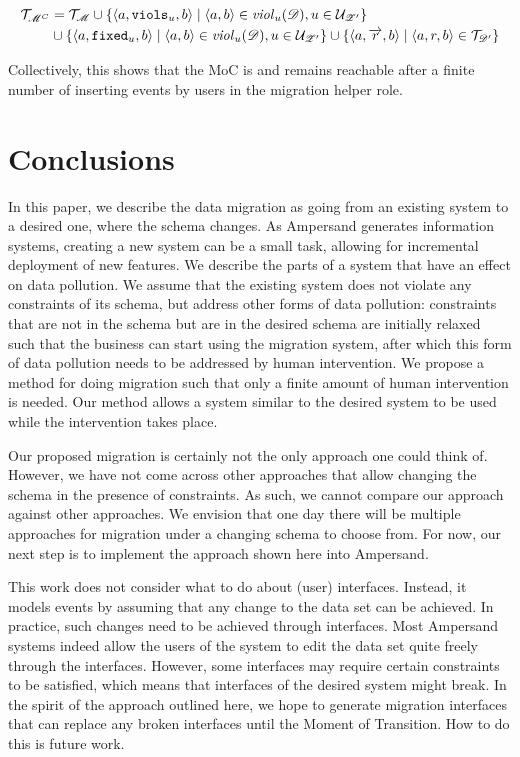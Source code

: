 \documentclass[runningheads]{llncs}
\newcommand{\id}[1]{\text{\it #1\/}}
\newcommand{\viol}[2]{\violC{#1}(#2)}
\newcommand{\violC}[1]{\id{viol}_{#1}}
\newcommand{\pair}[2]{\langle{#1},{#2}\rangle}
\newcommand{\triple}[3]{\langle{#1},{#2},{#3}\rangle}
\newcommand{\triples}{\mathcal{T}}
\newcommand{\rules}{\mathcal{U}}
\newcommand{\dataset}{\mathscr{D}}
\newcommand{\schema}{\mathscr{Z}}
\newcommand{\migrsys}{\mathscr{M}}
\begin{document}
\begin{align}
   \begin{aligned}
   \triples_{\migrsys^C} &= \triples_\migrsys 
   \cup  \{\triple{a}{{\tt viols}_u}{b} \mid \pair{a}{b}\in \viol{u}{\dataset}, u\in \rules_{\schema'} \} \\
   &\cup \{\triple{a}{{\tt fixed}_u}{b} \mid \pair{a}{b}\in \viol{u}{\dataset}, u\in \rules_{\schema'} \}
   \cup \{\triple{a}{\overrightarrow{r}}{b} \mid \triple{a}{r}{b}\in\triples_{\dataset'}\}   
   \end{aligned}
\end{align}
   
   Collectively, this shows that the MoC is and remains reachable after a finite number of inserting events by users in the migration helper role.
   
\section{Conclusions}

   In this paper, we describe the data migration as going from an existing system to a desired one, where the schema changes.
   As Ampersand generates information systems, creating a new system can be a small task, allowing for incremental deployment of new features.
   We describe the parts of a system that have an effect on data pollution.
   We assume that the existing system does not violate any constraints of its schema, but address other forms of data pollution:
   constraints that are not in the schema but are in the desired schema are initially relaxed such that the business can start using the migration system, after which this form of data pollution needs to be addressed by human intervention.
   We propose a method for doing migration such that only a finite amount of human intervention is needed.
   Our method allows a system similar to the desired system to be used while the intervention takes place.

   Our proposed migration is certainly not the only approach one could think of.
   However, we have not come across other approaches that allow changing the schema in the presence of constraints.
   As such, we cannot compare our approach against other approaches.
   We envision that one day there will be multiple approaches for migration under a changing schema to choose from.
   For now, our next step is to implement the approach shown here into Ampersand.

   This work does not consider what to do about (user) interfaces.
   Instead, it models events by assuming that any change to the data set can be achieved.
   In practice, such changes need to be achieved through interfaces.
   Most Ampersand systems indeed allow the users of the system to edit the data set quite freely through the interfaces.
   However, some interfaces may require certain constraints to be satisfied, which means that interfaces of the desired system might break.
   In the spirit of the approach outlined here, we hope to generate migration interfaces that can replace any broken interfaces until the Moment of Transition.
   How to do this is future work.



\end{document}
